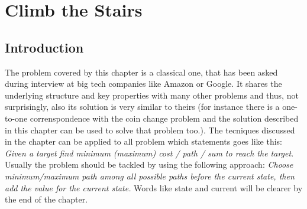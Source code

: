 %

\chapter{Climb the Stairs}
\label{ch:stairs_climbing}
\section*{Introduction}
The problem covered by this chapter is a classical one, that has been asked during interview at big tech companies like Amazon or Google. It shares the underlying structure and key properties with many other problems and thus, not surprisingly, also its solution is very similar to theirs (for instance there is a one-to-one correnspondence with the coin change problem and the solution described in this chapter can be used to solve that problem too.). The tecniques discussed in the chapter can be applied to all problem which statements goes like this: \textit{Given a target find minimum (maximum) cost / path / sum to reach the target}. Usually the problem should be tackled by using the following approach: \textit{Choose minimum/maximum path among all possible paths before the current state, then add the value for the current state.}
Words like state and current will be clearer by the end of the chapter.

